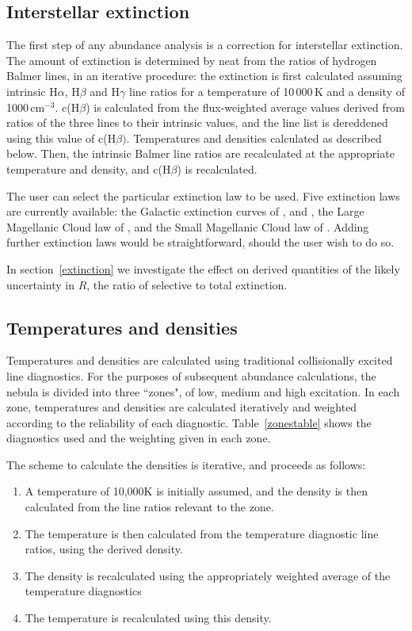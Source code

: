 \documentclass[useAMS,usenatbib]{mn2e}
\begin{document}
\subsection{Interstellar extinction}
\label{extinctionsection}
The first step of any abundance analysis is a correction for interstellar extinction.  The amount of extinction is determined by {\sc neat} from the ratios of hydrogen Balmer lines, in an iterative procedure: the extinction is first calculated assuming intrinsic H$\alpha$, H$\beta$ and H$\gamma$ line ratios for a temperature of 10\,000\,K and a density of 1000\,cm$^{-3}$.  c(H$\beta$) is calculated from the flux-weighted average values derived from ratios of the three lines to their intrinsic values, and the line list is dereddened using this value of c(H$\beta)$.  Temperatures and densities calculated as described below.  Then, the intrinsic Balmer line ratios are recalculated at the appropriate temperature and density, and c(H$\beta$) is recalculated.

The user can select the particular extinction law to be used.  Five extinction laws are currently available: the Galactic extinction curves of \citet{1983MNRAS.203..301H}, \citet{1990ApJS...72..163F} and \citet{1989ApJ...345..245C}, the Large Magellanic Cloud law of \citet{1983MNRAS.203..301H}, and the Small Magellanic Cloud law of \citet{1984A&A...132..389P}.  Adding further extinction laws would be straightforward, should the user wish to do so.

In section~\ref{extinction} we investigate the effect on derived quantities of the likely uncertainty in $R$, the ratio of selective to total extinction.

\subsection{Temperatures and densities}

Temperatures and densities are calculated using traditional collisionally excited line diagnostics.  For the purposes of subsequent abundance calculations, the nebula is divided into three ``zones", of low, medium and high excitation.  In each zone, temperatures and densities are calculated iteratively and weighted according to the reliability of each diagnostic.  Table~\ref{zonestable} shows the diagnostics used and the weighting given in each zone.

The scheme to calculate the densities is iterative, and proceeds as follows:

\begin{enumerate}
\item A temperature of 10,000K is initially assumed, and the density is then calculated from the line ratios relevant to the zone.
\item The temperature is then calculated from the temperature diagnostic line ratios, using the derived density.
\item The density is recalculated using the appropriately weighted average of the temperature diagnostics
\item The temperature is recalculated using this density.
\end{enumerate}
\end{document}
